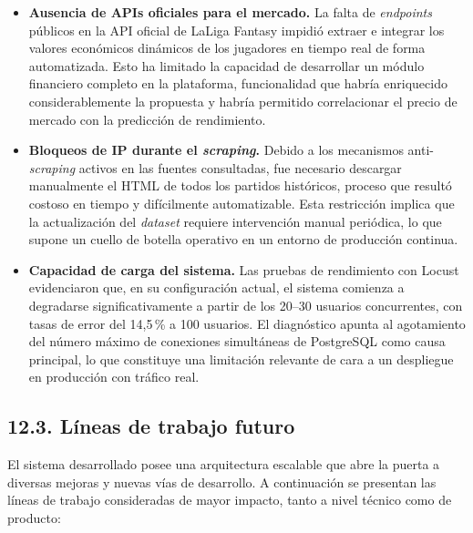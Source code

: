 \begin{itemize}
  \item \textbf{Ausencia de APIs oficiales para el mercado.} La falta
        de \textit{endpoints} públicos en la API oficial de LaLiga
        Fantasy impidió extraer e integrar los valores económicos
        dinámicos de los jugadores en tiempo real de forma automatizada.
        Esto ha limitado la capacidad de desarrollar un módulo
        financiero completo en la plataforma, funcionalidad que habría
        enriquecido considerablemente la propuesta y habría permitido
        correlacionar el precio de mercado con la predicción de
        rendimiento.

  \item \textbf{Bloqueos de IP durante el \textit{scraping}.} Debido
        a los mecanismos anti-\textit{scraping} activos en las fuentes
        consultadas, fue necesario descargar manualmente el HTML de
        todos los partidos históricos, proceso que resultó costoso en
        tiempo y difícilmente automatizable. Esta restricción implica
        que la actualización del \textit{dataset} requiere intervención
        manual periódica, lo que supone un cuello de botella operativo
        en un entorno de producción continua.

  \item \textbf{Capacidad de carga del sistema.} Las pruebas de
        rendimiento con Locust evidenciaron que, en su configuración
        actual, el sistema comienza a degradarse significativamente a
        partir de los 20--30 usuarios concurrentes, con tasas de error
        del 14,5\,\% a 100 usuarios. El diagnóstico apunta al agotamiento
        del número máximo de conexiones simultáneas de PostgreSQL como
        causa principal, lo que constituye una limitación relevante de
        cara a un despliegue en producción con tráfico real.
\end{itemize}

\subsection{12.3. Líneas de trabajo futuro}
\label{subsec:trabajo_futuro}

El sistema desarrollado posee una arquitectura escalable que abre la
puerta a diversas mejoras y nuevas vías de desarrollo. A continuación
se presentan las líneas de trabajo consideradas de mayor impacto, tanto
a nivel técnico como de producto:

